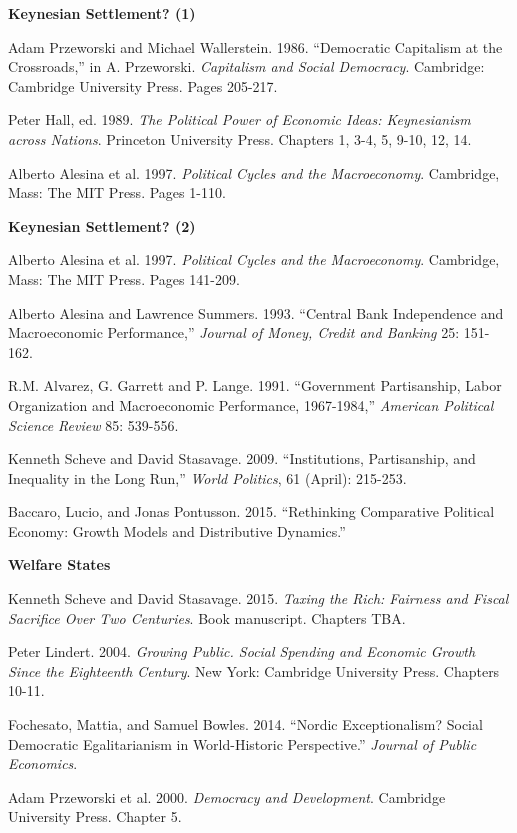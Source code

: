 \documentclass[letterpaper]{article}
\renewenvironment{itemize}{
  \begin{list}{}{
    \setlength{\leftmargin}{1.5em}
  }
}{
  \end{list}
}
\begin{document}
\begin{enumerate}
\item {\bf Keynesian Settlement? (1)}

	\begin{itemize}
		\item[$\bullet$] Adam Przeworski and Michael Wallerstein. 1986. ``Democratic Capitalism at the Crossroads,'' in A. Przeworski. \emph{Capitalism and Social Democracy}. Cambridge: Cambridge University Press. Pages 205-217.
		\item[$\bullet$] Peter Hall, ed. 1989. \emph{The Political Power of Economic Ideas: Keynesianism across Nations}. Princeton University Press. Chapters 1, 3-4, 5, 9-10, 12, 14.
		\item[$\bullet$] Alberto Alesina et al. 1997. \emph{Political Cycles and the Macroeconomy}. Cambridge, Mass: The MIT Press. Pages 1-110.
	\end{itemize}

\item {\bf Keynesian Settlement? (2)}

	\begin{itemize}
		\item[$\bullet$] Alberto Alesina et al. 1997. \emph{Political Cycles and the Macroeconomy}. Cambridge, Mass: The MIT Press. Pages 141-209. 
		\item[$\bullet$] Alberto Alesina and Lawrence Summers. 1993. ``Central Bank Independence and Macroeconomic Performance,'' \emph{Journal of Money, Credit and Banking} 25: 151-162.
		\item[$\bullet$] R.M. Alvarez, G. Garrett and P. Lange. 1991. ``Government Partisanship, Labor Organization and Macroeconomic Performance, 1967-1984,'' \emph{American Political Science Review} 85: 539-556.
		\item[$\bullet$] Kenneth Scheve and David Stasavage. 2009. ``Institutions, Partisanship, and Inequality in the Long Run,'' \emph{World Politics}, 61 (April): 215-253.
		\item[$\bullet$] Baccaro, Lucio, and Jonas Pontusson. 2015. ``Rethinking Comparative Political Economy: Growth Models and Distributive Dynamics.''
	\end{itemize}

\item {\bf Welfare States}

	\begin{itemize}
		\item[$\bullet$] Kenneth Scheve and David Stasavage. 2015. \emph{Taxing the Rich: Fairness and Fiscal Sacrifice Over Two Centuries}. Book manuscript. Chapters TBA.
		\item[$\bullet$] Peter Lindert. 2004. \emph{Growing Public. Social Spending and Economic Growth Since the Eighteenth Century}. New York: Cambridge University Press. Chapters 10-11.
		\item[$\bullet$] Fochesato, Mattia, and Samuel Bowles. 2014. ``Nordic Exceptionalism? Social Democratic Egalitarianism in World-Historic Perspective.'' \emph{Journal of Public Economics}.
		\item[$\bullet$] Adam Przeworski et al. 2000. \emph{Democracy and Development}. Cambridge University Press. Chapter 5. 
	\end{itemize}


\end{enumerate}
\end{document}
